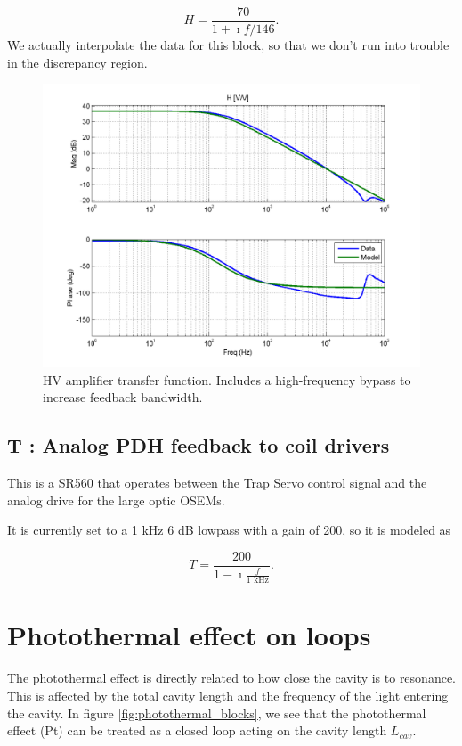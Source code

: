 \begin{equation}
H = \frac{70}{1+\imath f/146}.
\label{eq:Hmodel}
\end{equation}
We actually interpolate the data for this block, so that we don't run into trouble in the discrepancy region.


\begin{figure}[htbp]
\includegraphics[width=\columnwidth]{figures/controls/H.png}%
\caption{HV amplifier transfer function. Includes a high-frequency bypass to increase feedback bandwidth.}%
\label{fig:H}%
\end{figure}


\subsection{T : Analog PDH feedback to coil drivers}

This is a SR560 that operates between the Trap Servo control signal and the analog drive for the large optic OSEMs.

It is currently set to a 1 kHz 6 dB lowpass with a gain of 200, so it is modeled as 

\begin{equation}
T = \frac{200}{1 - \imath \frac{f}{1\mbox{ kHz}}}.
\label{eq:T}
\end{equation}						



\section{Photothermal effect on loops}
The photothermal effect is directly related to how close the cavity is to resonance. This is affected by the total cavity length and the frequency of the light entering the cavity. In figure \ref{fig:photothermal_blocks}, we see that the photothermal effect (Pt) can be treated as a closed loop acting on the cavity length $L_{cav}$.

